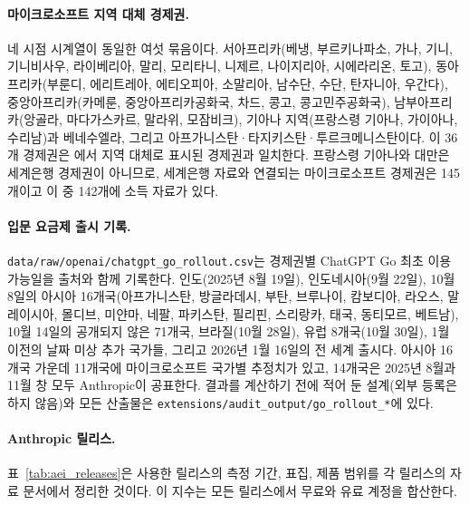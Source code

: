 \documentclass[11pt]{article}
\theoremstyle{definition}
\theoremstyle{remark}
\begin{document}
\paragraph{마이크로소프트 지역 대체 경제권.} 네 시점 시계열이 동일한 여섯 묶음이다. 서아프리카(베냉, 부르키나파소, 가나, 기니, 기니비사우, 라이베리아, 말리, 모리타니, 니제르, 나이지리아, 시에라리온, 토고), 동아프리카(부룬디, 에리트레아, 에티오피아, 소말리아, 남수단, 수단, 탄자니아, 우간다), 중앙아프리카(카메룬, 중앙아프리카공화국, 차드, 콩고, 콩고민주공화국), 남부아프리카(앙골라, 마다가스카르, 말라위, 모잠비크), 기아나 지역(프랑스령 기아나, 가이아나, 수리남)과 베네수엘라, 그리고 아프가니스탄·타지키스탄·투르크메니스탄이다. 이 36개 경제권은 \citet[부록 표 2]{misra2025measuring}에서 지역 대체로 표시된 경제권과 일치한다. 프랑스령 기아나와 대만은 세계은행 경제권이 아니므로, 세계은행 자료와 연결되는 마이크로소프트 경제권은 145개이고 이 중 142개에 소득 자료가 있다.

\paragraph{입문 요금제 출시 기록.} \nolinkurl{data/raw/openai/chatgpt_go_rollout.csv}는 경제권별 ChatGPT Go 최초 이용 가능일을 출처와 함께 기록한다. 인도(2025년 8월 19일), 인도네시아(9월 22일), 10월 8일의 아시아 16개국(아프가니스탄, 방글라데시, 부탄, 브루나이, 캄보디아, 라오스, 말레이시아, 몰디브, 미얀마, 네팔, 파키스탄, 필리핀, 스리랑카, 태국, 동티모르, 베트남), 10월 14일의 공개되지 않은 71개국, 브라질(10월 28일), 유럽 8개국(10월 30일), 1월 이전의 날짜 미상 추가 국가들, 그리고 2026년 1월 16일의 전 세계 출시다. 아시아 16개국 가운데 11개국에 마이크로소프트 국가별 추정치가 있고, 14개국은 2025년 8월과 11월 창 모두 Anthropic이 공표한다. 결과를 계산하기 전에 적어 둔 설계(외부 등록은 하지 않음)와 모든 산출물은 \nolinkurl{extensions/audit_output/go_rollout_*}에 있다.

\paragraph{Anthropic 릴리스.} 표~\ref{tab:aei_releases}은 사용한 릴리스의 측정 기간, 표집, 제품 범위를 각 릴리스의 자료 문서에서 정리한 것이다. 이 지수는 모든 릴리스에서 무료와 유료 계정을 합산한다.
\end{document}
